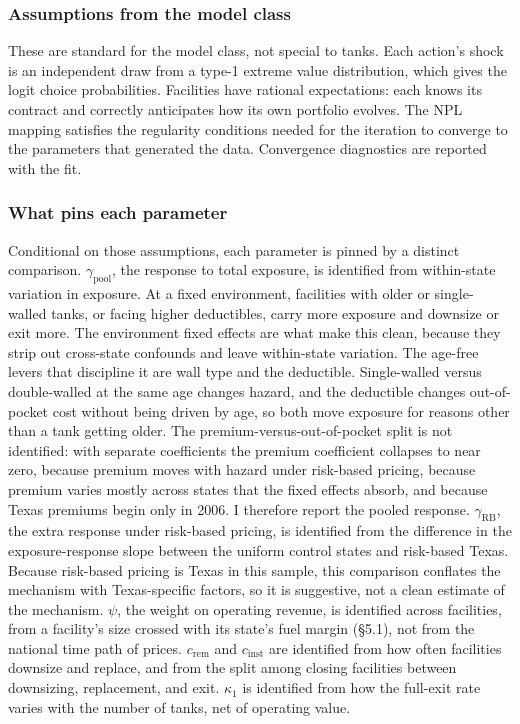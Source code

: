 \documentclass[
  12pt,
]{article}
\begin{document}
\subsubsection{Assumptions from the model
class}\label{assumptions-from-the-model-class}

These are standard for the model class, not special to tanks. Each
action's shock is an independent draw from a type-1 extreme value
distribution, which gives the logit choice probabilities. Facilities
have rational expectations: each knows its contract and correctly
anticipates how its own portfolio evolves. The NPL mapping satisfies the
regularity conditions needed for the iteration to converge to the
parameters that generated the data. Convergence diagnostics are reported
with the fit.

\subsubsection{What pins each parameter}\label{what-pins-each-parameter}

Conditional on those assumptions, each parameter is pinned by a distinct
comparison. \(\gamma_{\text{pool}}\), the response to total exposure, is
identified from within-state variation in exposure. At a fixed
environment, facilities with older or single-walled tanks, or facing
higher deductibles, carry more exposure and downsize or exit more. The
environment fixed effects are what make this clean, because they strip
out cross-state confounds and leave within-state variation. The age-free
levers that discipline it are wall type and the deductible.
Single-walled versus double-walled at the same age changes hazard, and
the deductible changes out-of-pocket cost without being driven by age,
so both move exposure for reasons other than a tank getting older. The
premium-versus-out-of-pocket split is not identified: with separate
coefficients the premium coefficient collapses to near zero, because
premium moves with hazard under risk-based pricing, because premium
varies mostly across states that the fixed effects absorb, and because
Texas premiums begin only in 2006. I therefore report the pooled
response. \(\gamma_{\text{RB}}\), the extra response under risk-based
pricing, is identified from the difference in the exposure-response
slope between the uniform control states and risk-based Texas. Because
risk-based pricing is Texas in this sample, this comparison conflates
the mechanism with Texas-specific factors, so it is suggestive, not a
clean estimate of the mechanism. \(\psi\), the weight on operating
revenue, is identified across facilities, from a facility's size crossed
with its state's fuel margin (§5.1), not from the national time path of
prices. \(c_{\text{rem}}\) and \(c_{\text{inst}}\) are identified from
how often facilities downsize and replace, and from the split among
closing facilities between downsizing, replacement, and exit.
\(\kappa_1\) is identified from how the full-exit rate varies with the
number of tanks, net of operating value.
\end{document}
